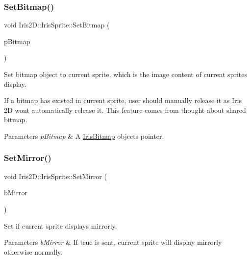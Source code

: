 \subsubsection{\texorpdfstring{Set\+Bitmap()}{SetBitmap()}}
{\footnotesize\ttfamily void Iris2\+D\+::\+Iris\+Sprite\+::\+Set\+Bitmap (\begin{DoxyParamCaption}\item[{\hyperlink{class_iris2_d_1_1_iris_bitmap}{Iris\+Bitmap} $\ast$}]{p\+Bitmap }\end{DoxyParamCaption})}



Set bitmap object to current sprite, which is the image content of current sprite\textquotesingle{}s display. 

If a bitmap has existed in current sprite, user should manually release it as Iris 2D won\textquotesingle{}t automatically release it. This feature comes from thought about shared bitmap. 
\begin{DoxyParams}{Parameters}
{\em p\+Bitmap} & A \hyperlink{class_iris2_d_1_1_iris_bitmap}{Iris\+Bitmap} object\textquotesingle{}s pointer. \\
\hline
\end{DoxyParams}
\mbox{\label{class_iris2_d_1_1_iris_sprite_a3ce55ee044b8345e93f8dfd45f23c72f}} 
\subsubsection{\texorpdfstring{Set\+Mirror()}{SetMirror()}}
{\footnotesize\ttfamily void Iris2\+D\+::\+Iris\+Sprite\+::\+Set\+Mirror (\begin{DoxyParamCaption}\item[{bool}]{b\+Mirror }\end{DoxyParamCaption})}



Set if current sprite displays mirrorly. 


\begin{DoxyParams}{Parameters}
{\em b\+Mirror} & If true is sent, current sprite will display mirrorly otherwise normally. \\
\hline
\end{DoxyParams}
\mbox{\label{class_iris2_d_1_1_iris_sprite_a8f32660ac464af824864c2af8c883039}} 
